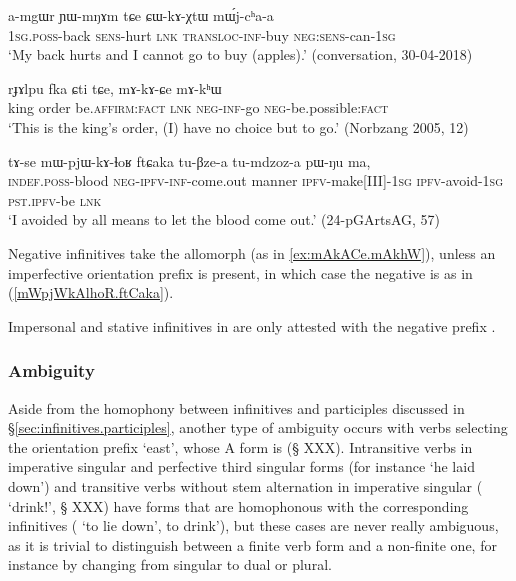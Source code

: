 \begin{exe}
\ex \label{ex:CWkAXtW}
\gll a-mgɯr ɲɯ-mŋɤm tɕe ɕɯ-kɤ-χtɯ mɯ́j-cʰa-a \\
\textsc{1sg}.\textsc{poss}-back \textsc{sens}-hurt \textsc{lnk} \textsc{transloc}-\textsc{inf}-buy \textsc{neg}:\textsc{sens}-can-\textsc{1sg} \\
\glt `My back hurts and I cannot go to  buy (apples).' (conversation, 30-04-2018)
\end{exe}
 
\begin{exe}
\ex \label{ex:mAkACe.mAkhW}
\gll   rɟɤlpu fka ɕti tɕe, mɤ-kɤ-ɕe mɤ-kʰɯ \\
king order be.\textsc{affirm}:\textsc{fact} \textsc{lnk} \textsc{neg}-\textsc{inf}-go \textsc{neg}-be.possible:\textsc{fact} \\
\glt `This is the king's order, (I) have no choice but to go.' (Norbzang 2005, 12)
\end{exe}
 
\begin{exe}
\ex \label{mWpjWkAlhoR.ftCaka}
 \gll  tɤ-se mɯ-pjɯ-kɤ-ɬoʁ ftɕaka tu-βze-a tu-mdzoz-a pɯ-ŋu ma, \\
 \textsc{indef}.\textsc{poss}-blood \textsc{neg}-\textsc{ipfv}-\textsc{inf}-come.out manner \textsc{ipfv}-make[III]-\textsc{1sg} \textsc{ipfv}-avoid-\textsc{1sg} \textsc{pst}.\textsc{ipfv}-be \textsc{lnk} \\
\glt `I avoided by all means to let the blood come out.' (24-pGArtsAG, 57)
 \end{exe}
 
Negative infinitives take the allomorph  (as in \ref{ex:mAkACe.mAkhW}), unless an imperfective orientation prefix is present, in which case the negative is  as in (\ref{mWpjWkAlhoR.ftCaka}).

Impersonal and stative infinitives in  are only attested with the negative prefix .

\subsubsection{Ambiguity}  \label{sec:velar.inf.ambiguity}
Aside from the homophony between infinitives and participles discussed in §\ref{sec:infinitives.participles}, another type of ambiguity occurs with verbs selecting the orientation prefix `east', whose A form is  (§ XXX). Intransitive verbs in imperative singular and perfective third singular forms (for instance  `he laid down') and transitive verbs without stem alternation in imperative singular ( `drink!', § XXX) have forms that are homophonous with the corresponding infinitives (  `to lie down',   to drink'), but these cases are never really ambiguous, as it is trivial to distinguish between a finite verb form and a non-finite one, for instance by changing from singular to dual or plural. 

